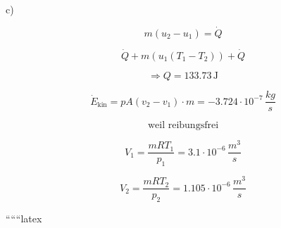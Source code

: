 c)

\[
m (u_2 - u_1) = \dot{Q}
\]

\[
\dot{Q} + m (u_1 (T_1 - T_2)) + \dot{Q}
\]

\[
\Rightarrow Q = 133.73 \, \text{J}
\]

\[
\dot{E}_{\text{kin}} = pA (v_2 - v_1) \cdot m = -3.724 \cdot 10^{-7} \, \frac{kg}{s}
\]

\[
\text{weil reibungsfrei}
\]

\[
V_1 = \frac{mRT_1}{p_1} = 3.1 \cdot 10^{-6} \, \frac{m^3}{s}
\]

\[
V_2 = \frac{mRT_2}{p_2} = 1.105 \cdot 10^{-6} \, \frac{m^3}{s}
\]

``````latex
